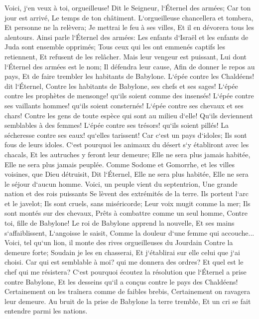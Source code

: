 \verse Voici, j`en veux à toi, orgueilleuse! Dit le Seigneur, l`Éternel des armées; Car ton jour est arrivé, Le temps de ton châtiment. 
\verse L`orgueilleuse chancellera et tombera, Et personne ne la relèvera; Je mettrai le feu à ses villes, Et il en dévorera tous les alentours. 
\verse Ainsi parle l`Éternel des armées: Les enfants d`Israël et les enfants de Juda sont ensemble opprimés; Tous ceux qui les ont emmenés captifs les retiennent, Et refusent de les relâcher. 
\verse Mais leur vengeur est puissant, Lui dont l`Éternel des armées est le nom; Il défendra leur cause, Afin de donner le repos au pays, Et de faire trembler les habitants de Babylone. 
\verse L`épée contre les Chaldéens! dit l`Éternel, Contre les habitants de Babylone, ses chefs et ses sages! 
\verse L`épée contre les prophètes de mensonge! qu`ils soient comme des insensés! L`épée contre ses vaillants hommes! qu`ils soient consternés! 
\verse L`épée contre ses chevaux et ses chars! Contre les gens de toute espèce qui sont au milieu d`elle! Qu`ils deviennent semblables à des femmes! L`épée contre ses trésors! qu`ils soient pillés! 
\verse La sécheresse contre ses eaux! qu`elles tarissent! Car c`est un pays d`idoles; Ils sont fous de leurs idoles. 
\verse C`est pourquoi les animaux du désert s`y établiront avec les chacals, Et les autruches y feront leur demeure; Elle ne sera plus jamais habitée, Elle ne sera plus jamais peuplée. 
\verse Comme Sodome et Gomorrhe, et les villes voisines, que Dieu détruisit, Dit l`Éternel, Elle ne sera plus habitée, Elle ne sera le séjour d`aucun homme. 
\verse Voici, un peuple vient du septentrion, Une grande nation et des rois puissants Se lèvent des extrémités de la terre. 
\verse Ils portent l`arc et le javelot; Ils sont cruels, sans miséricorde; Leur voix mugit comme la mer; Ils sont montés sur des chevaux, Prêts à combattre comme un seul homme, Contre toi, fille de Babylone! 
\verse Le roi de Babylone apprend la nouvelle, Et ses mains s`affaiblissent, L`angoisse le saisit, Comme la douleur d`une femme qui accouche... 
\verse Voici, tel qu`un lion, il monte des rives orgueilleuses du Jourdain Contre la demeure forte; Soudain je les en chasserai, Et j`établirai sur elle celui que j`ai choisi. Car qui est semblable à moi? qui me donnera des ordres? Et quel est le chef qui me résistera? 
\verse C`est pourquoi écoutez la résolution que l`Éternel a prise contre Babylone, Et les desseins qu`il a conçus contre le pays des Chaldéens! Certainement on les traînera comme de faibles brebis, Certainement on ravagera leur demeure. 
\verse Au bruit de la prise de Babylone la terre tremble, Et un cri se fait entendre parmi les nations. 


